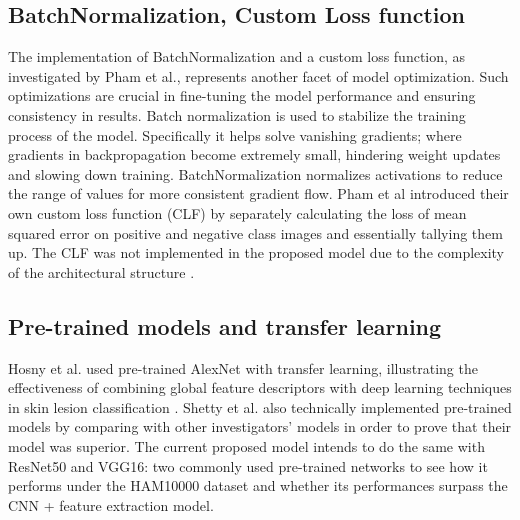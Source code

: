 \documentclass[10pt,twocolumn]{article}
\begin{document}
\subsection{BatchNormalization, Custom Loss function}
The implementation of BatchNormalization and a custom loss function, as investigated by Pham et al., represents another facet of model optimization. Such optimizations are crucial in fine-tuning the model performance and ensuring consistency in results. Batch normalization is used to stabilize the training process of the model. Specifically it helps solve vanishing gradients; where gradients in backpropagation become extremely small, hindering weight updates and slowing down training. BatchNormalization normalizes activations to reduce the range of values for more consistent gradient flow. Pham et al introduced their own custom loss function (CLF) by separately calculating the loss of mean squared error on positive and negative class images and essentially tallying them up. The CLF was not implemented in the proposed model due to the complexity of the architectural structure \cite{pham2021ai}. 

\subsection{Pre-trained models and transfer learning}
Hosny et al. used pre-trained AlexNet with transfer learning, illustrating the effectiveness of combining global feature descriptors with deep learning techniques in skin lesion classification \cite{shetty2022skin}. Shetty et al. also technically implemented pre-trained models by comparing with other investigators’ models in order to prove that their model was superior. The current proposed model intends to do the same with ResNet50 and VGG16: two commonly used pre-trained networks to see how it performs under the HAM10000 dataset and whether its performances surpass the CNN + feature extraction model. 
\end{document}
